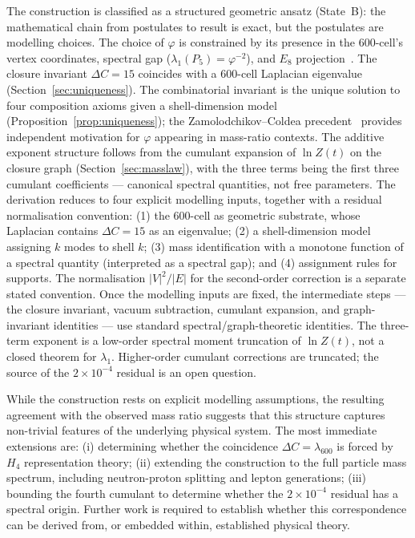 \documentclass[12pt]{article}
\newcommand{\phig}{\varphi}
\begin{document}
The construction is classified as a structured geometric ansatz (State~B): the mathematical chain from postulates to result is exact, but the postulates are modelling choices. The choice of $\phig$ is constrained by its presence in the 600-cell's vertex coordinates, spectral gap ($\lambda_1(P_5) = \phig^{-2}$), and $E_8$ projection~\citep{Coxeter1973}. The closure invariant $\Delta C = 15$ coincides with a 600-cell Laplacian eigenvalue (Section~\ref{sec:uniqueness}). The combinatorial invariant is the unique solution to four composition axioms given a shell-dimension model (Proposition~\ref{prop:uniqueness}); the Zamolodchikov--Coldea precedent~\citep{Zamolodchikov1989, Coldea2010} provides independent motivation for $\phig$ appearing in mass-ratio contexts. The additive exponent structure follows from the cumulant expansion of $\ln Z(t)$ on the closure graph (Section~\ref{sec:masslaw}), with the three terms being the first three cumulant coefficients --- canonical spectral quantities, not free parameters. The derivation reduces to four explicit modelling inputs, together with a residual normalisation convention: (1) the 600-cell as geometric substrate, whose Laplacian contains $\Delta C = 15$ as an eigenvalue; (2) a shell-dimension model assigning $k$ modes to shell $k$; (3) mass identification with a monotone function of a spectral quantity (interpreted as a spectral gap); and (4) assignment rules for supports. The normalisation $|V|^2/|E|$ for the second-order correction is a separate stated convention. Once the modelling inputs are fixed, the intermediate steps --- the closure invariant, vacuum subtraction, cumulant expansion, and graph-invariant identities --- use standard spectral/graph-theoretic identities. The three-term exponent is a low-order spectral moment truncation of $\ln Z(t)$, not a closed theorem for $\lambda_1$. Higher-order cumulant corrections are truncated; the source of the $2 \times 10^{-4}$ residual is an open question.

While the construction rests on explicit modelling assumptions, the resulting agreement with the observed mass ratio suggests that this structure captures non-trivial features of the underlying physical system. The most immediate extensions are: (i) determining whether the coincidence $\Delta C = \lambda_{600}$ is forced by $H_4$ representation theory; (ii) extending the construction to the full particle mass spectrum, including neutron-proton splitting and lepton generations; (iii) bounding the fourth cumulant to determine whether the $2 \times 10^{-4}$ residual has a spectral origin. Further work is required to establish whether this correspondence can be derived from, or embedded within, established physical theory.
\end{document}
